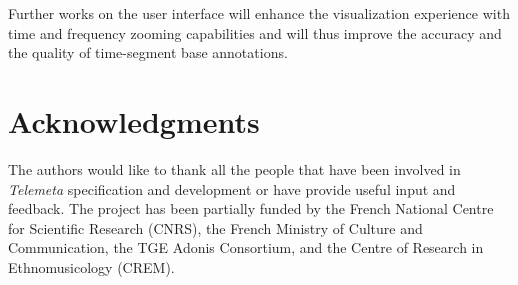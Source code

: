 \documentclass{paper}
\begin{document}
Further works on the user interface will enhance the visualization experience with time and frequency zooming capabilities and will thus improve the accuracy and the quality of time-segment base annotations.



\pagebreak

\section*{Acknowledgments} 
{\small The authors would like to thank all the people that have been involved in \emph{Telemeta} specification and development or have provide useful input and feedback. 
The project has been partially funded by the French National Centre for Scientific Research (CNRS), the French Ministry of Culture and Communication, the TGE Adonis Consortium, and the Centre of Research in Ethnomusicology (CREM).}




\end{document}
